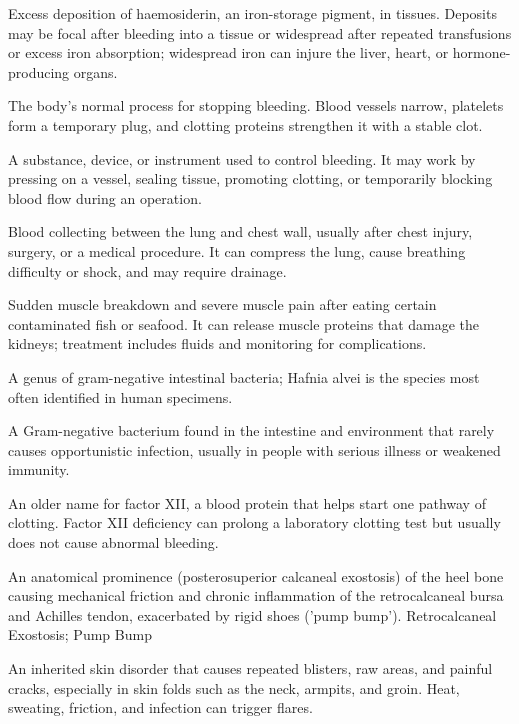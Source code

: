  Excess deposition of haemosiderin, an iron-storage pigment, in tissues. Deposits may be focal after bleeding into a tissue or widespread after repeated transfusions or excess iron absorption; widespread iron can injure the liver, heart, or hormone-producing organs.

 The body’s normal process for stopping bleeding. Blood vessels narrow, platelets form a temporary plug, and clotting proteins strengthen it with a stable clot.

 A substance, device, or instrument used to control bleeding. It may work by pressing on a vessel, sealing tissue, promoting clotting, or temporarily blocking blood flow during an operation.

 Blood collecting between the lung and chest wall, usually after chest injury, surgery, or a medical procedure. It can compress the lung, cause breathing difficulty or shock, and may require drainage.

 Sudden muscle breakdown and severe muscle pain after eating certain contaminated fish or seafood. It can release muscle proteins that damage the kidneys; treatment includes fluids and monitoring for complications.

 A genus of gram-negative intestinal bacteria; Hafnia alvei is the species most often identified in human specimens.

 A Gram-negative bacterium found in the intestine and environment that rarely causes opportunistic infection, usually in people with serious illness or weakened immunity.

 An older name for factor XII, a blood protein that helps start one pathway of clotting. Factor XII deficiency can prolong a laboratory clotting test but usually does not cause abnormal bleeding.

 An anatomical prominence (posterosuperior calcaneal exostosis) of the heel bone causing mechanical friction and chronic inflammation of the retrocalcaneal bursa and Achilles tendon, exacerbated by rigid shoes ('pump bump').
\synonyms
Retrocalcaneal Exostosis; Pump Bump

 An inherited skin disorder that causes repeated blisters, raw areas, and painful cracks, especially in skin folds such as the neck, armpits, and groin. Heat, sweating, friction, and infection can trigger flares.

